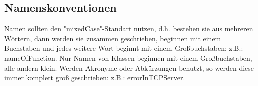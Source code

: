 \subsection{Namenskonventionen}
Namen sollten den "mixedCase"-Standart nutzen, d.h. bestehen sie aus mehreren Wörtern, dann werden sie zusammen geschrieben, beginnen mit einem Buchstaben und jedes weitere Wort beginnt mit einem Großbuchstaben: z.B.: nameOfFunction. Nur Namen von Klassen beginnen mit einem Großbuchstaben, alle andern klein. Werden Akronyme oder Abkürzungen benutzt, so werden diese immer komplett groß geschrieben: z.B.: errorInTCPServer.
